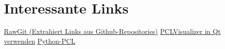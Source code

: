 \section{Interessante Links}\label{interessante-links}

\href{http://rawgit.com}{RawGit (Extrahiert Links aus
Github-Repositories)}
\href{http://stackoverflow.com/a/11939703/3281871}{PCLVisualizer in Qt
verwenden} \href{https://github.com/strawlab/python-pcl}{Python-PCL}
